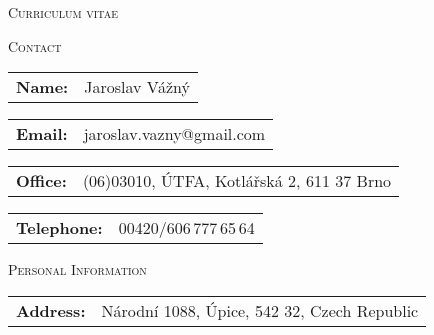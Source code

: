 \documentclass[10pt]{article}
\newlength{\oldcvlabelwidth}
\newlength{\oldcvlabelsep}
\begin{document}
\begin{cv}
\smallskip
\vspace{-1.2cm}
\begin{center}
 {\large \textsc{Curriculum vitae}\\ 
}\end{center}
 \vspace{-0.1 cm}

\setlength{\oldcvlabelwidth}{\cvlabelwidth}
\setlength{\oldcvlabelsep}{\cvlabelsep}

\setlength{\cvlabelwidth}{1em} 
\noindent\hrulefill
\begin{cvlist}{\large \textsc{Contact}}
\item \begin{tabular}{p{2cm}p{11cm}}  {\bf{Name:}} & Jaroslav Vážný\\
   \end{tabular}
 \item \begin{tabular}{p{2cm}p{11cm}}  
  {\bf{Email:}} & jaroslav.vazny@gmail.com\\
   \end{tabular}
  \item \begin{tabular}{p{2cm}p{11cm}}
  {\bf{Office:}} & (06)03010, ÚTFA, Kotlářská 2, 611 37 Brno\\
   \end{tabular}
   \item \begin{tabular}{p{2cm}p{11cm}}
  {\bf{Telephone:}} & 00420/606\,777\,65\,64\\
   \end{tabular}
\end{cvlist}

\begin{cvlist}{\large \textsc{Personal Information}}
\item \begin{tabular}{p{4cm}p{11cm}}  {\bf{Address:}} & Národní 1088, Úpice, 542 32, Czech Republic \end{tabular}
\end{cvlist}


\end{cv}
\end{document}
